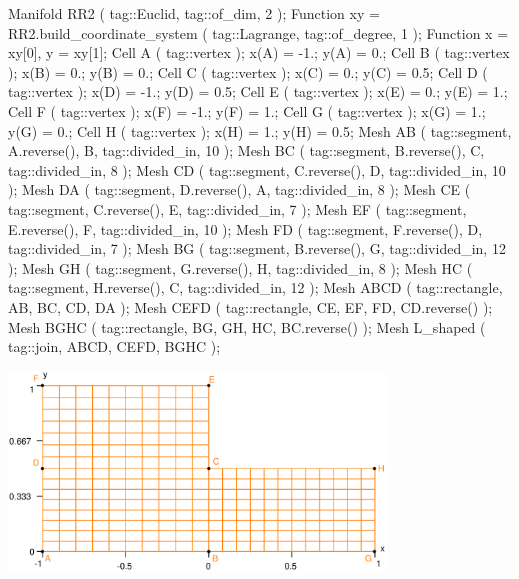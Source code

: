 \verbatim
   Manifold RR2 ( tag::Euclid, tag::of_dim, 2 );
   Function xy = RR2.build_coordinate_system ( tag::Lagrange, tag::of_degree, 1 );
   Function x = xy[0],  y = xy[1];
   Cell A ( tag::vertex );  x(A) = -1.;  y(A) = 0.;
   Cell B ( tag::vertex );  x(B) =  0.;  y(B) = 0.;
   Cell C ( tag::vertex );  x(C) =  0.;  y(C) = 0.5;
   Cell D ( tag::vertex );  x(D) = -1.;  y(D) = 0.5;
   Cell E ( tag::vertex );  x(E) =  0.;  y(E) = 1.;
   Cell F ( tag::vertex );  x(F) = -1.;  y(F) = 1.;
   Cell G ( tag::vertex );  x(G) =  1.;  y(G) = 0.;
   Cell H ( tag::vertex );  x(H) =  1.;  y(H) = 0.5;
   Mesh AB ( tag::segment, A.reverse(), B, tag::divided_in, 10 );
   Mesh BC ( tag::segment, B.reverse(), C, tag::divided_in, 8 );
   Mesh CD ( tag::segment, C.reverse(), D, tag::divided_in, 10 );
   Mesh DA ( tag::segment, D.reverse(), A, tag::divided_in, 8 );
   Mesh CE ( tag::segment, C.reverse(), E, tag::divided_in, 7 );
   Mesh EF ( tag::segment, E.reverse(), F, tag::divided_in, 10 );
   Mesh FD ( tag::segment, F.reverse(), D, tag::divided_in, 7 );
   Mesh BG ( tag::segment, B.reverse(), G, tag::divided_in, 12 );
   Mesh GH ( tag::segment, G.reverse(), H, tag::divided_in, 8 );
   Mesh HC ( tag::segment, H.reverse(), C, tag::divided_in, 12 );
   Mesh ABCD ( tag::rectangle, AB, BC, CD, DA );
   Mesh CEFD ( tag::rectangle, CE, EF, FD, CD.reverse() );
   Mesh BGHC ( tag::rectangle, BG, GH, HC, BC.reverse() );
   Mesh L_shaped ( tag::join, ABCD, CEFD, BGHC );
\endverbatim

{ 
\centerline{\includegraphics[width=10cm]{L-shaped.eps}} }

